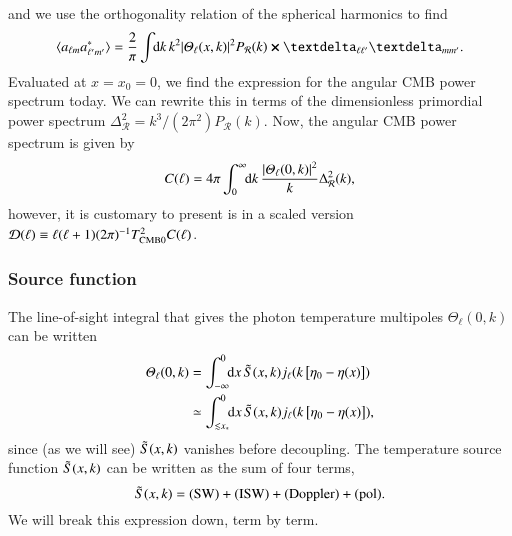and we use the orthogonality relation of the spherical harmonics to find
\begin{equation}
    \langle a\ellm a^*\ellmp \rangle = \frac{2}{\pi}\int \dx{k} k^2  \abs{\Theta_{\ell}(x,k)}^2P_\mathcal{R}(k) \cross \deltasym{\ell \ell'} \deltasym{m m'}.
\end{equation}
Evaluated at $x=x_0=0$, we find the expression for the angular CMB power spectrum today. We can rewrite this in terms of the dimensionless primordial power spectrum $\Delta^2_\mathcal{R} = k^3/(2\pi^2) P_\mathcal{R}(k)$. Now, the angular CMB power spectrum is given by
\begin{equation}\label{mil4:theo:eq:C_of_ell_final}
    C(\ell) = 4\pi \int_0^{\infty} \!\!\mathop{}\!\mathrm{d} {k}\, \frac{\abs{\varTheta_\ell(0,k)}^2}{k} \Delta_\mathcal{R}^2(k),
\end{equation}
however, it is customary to present is in a scaled version $\mathcal{D}(\ell) \equiv \ell (\ell +1) (2\pi)^{-1} T_{\mathrm{CMB}0}^2 C(\ell)$.





\subsubsection{Source function}
    The line-of-sight integral that gives the photon temperature multipoles $\Theta_\ell(0,k)$ can be written
    \begin{equation}\label{mil4:theo:eq:los_integration}
    \begin{split}
        \varTheta_\ell (0, k) &= \int_{-\infty}^{0} \!\!\mathop{}\!\mathrm{d} {x}\, \tilde{S}(x,k) j_\ell(k\left[\eta_0 -\eta(x)\right]) \\
        &\simeq  \int_{\lesssim x_*}^{0} \!\!\mathop{}\!\mathrm{d} {x}\, \tilde{S}(x,k) j_\ell(k\left[\eta_0 -\eta(x)\right]),
    \end{split}
    \end{equation}
    since (as we will see) $\tilde{S}(x,k)$ vanishes before decoupling. The temperature source function $\tilde{S}(x,k)$ can be written as the sum of four terms,
    \begin{equation}\label{mil4:theo:eq:source_function_four_terms}
        \tilde{S}(x,k) = \text{(SW)} + \text{(ISW)} + \text{(Doppler)} + \text{(pol)}.
    \end{equation}
    We will break this expression down, term by term. 

